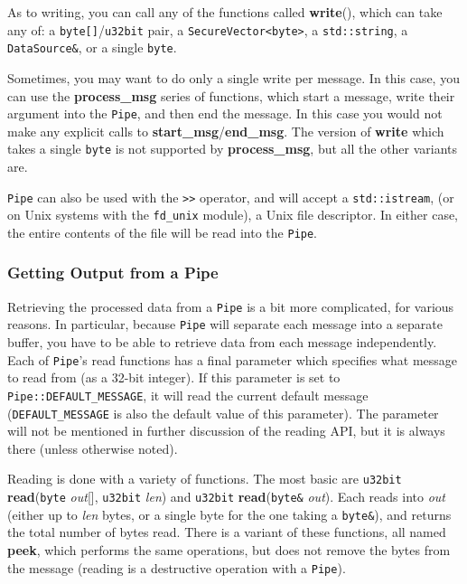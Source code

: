 \documentclass{article}
\newcommand{\function}[1]{\textbf{#1}}
\newcommand{\type}[1]{\texttt{#1}}
\renewcommand{\arg}[1]{\textsl{#1}}
\begin{document}
As to writing, you can call any of the functions called \function{write}(),
which can take any of: a \type{byte[]}/\type{u32bit} pair, a
\type{SecureVector<byte>}, a \type{std::string}, a \type{DataSource\&}, or a
single \type{byte}.

Sometimes, you may want to do only a single write per message. In this case,
you can use the \function{process\_msg} series of functions, which start a
message, write their argument into the \type{Pipe}, and then end the
message. In this case you would not make any explicit calls to
\function{start\_msg}/\function{end\_msg}. The version of \function{write}
which takes a single \type{byte} is not supported by \function{process\_msg},
but all the other variants are.

\type{Pipe} can also be used with the \verb|>>| operator, and will accept a
\type{std::istream}, (or on Unix systems with the \verb|fd_unix| module), a
Unix file descriptor. In either case, the entire contents of the file will be
read into the \type{Pipe}.

\subsubsection{Getting Output from a Pipe}

Retrieving the processed data from a \type{Pipe} is a bit more complicated, for
various reasons. In particular, because \type{Pipe} will separate each message
into a separate buffer, you have to be able to retrieve data from each message
independently. Each of \type{Pipe}'s read functions has a final parameter which
specifies what message to read from (as a 32-bit integer). If this parameter is
set to \type{Pipe::DEFAULT\_MESSAGE}, it will read the current default message
(\type{DEFAULT\_MESSAGE} is also the default value of this parameter). The
parameter will not be mentioned in further discussion of the reading API, but
it is always there (unless otherwise noted).

Reading is done with a variety of functions. The most basic are \type{u32bit}
\function{read}(\type{byte} \arg{out}[], \type{u32bit} \arg{len}) and
\type{u32bit} \function{read}(\type{byte\&} \arg{out}). Each reads into
\arg{out} (either up to \arg{len} bytes, or a single byte for the one taking a
\type{byte\&}), and returns the total number of bytes read. There is a variant
of these functions, all named \function{peek}, which performs the same
operations, but does not remove the bytes from the message (reading is a
destructive operation with a \type{Pipe}).
\end{document}
